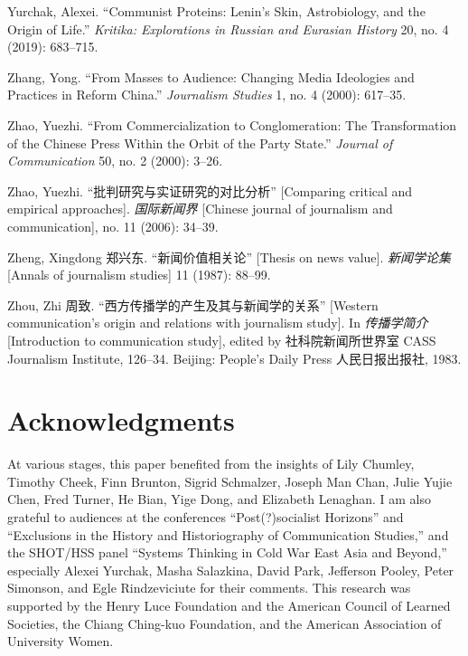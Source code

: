 \documentclass{tufte-handout}
\begin{document}
\begin{hangparas}{.25in}{1}
\begin{CJK*}{UTF8}{gbsn}
Yurchak, Alexei. ``Communist Proteins: Lenin's Skin, Astrobiology, and
the Origin of Life.'' \emph{Kritika: Explorations in Russian and
Eurasian History} 20, no. 4 (2019): 683--715.

Zhang, Yong. ``From Masses to Audience: Changing Media Ideologies and
Practices in Reform China.'' \emph{Journalism Studies} 1, no. 4 (2000):
617--35.

Zhao, Yuezhi. ``From Commercialization to Conglomeration: The
Transformation of the Chinese Press Within the Orbit of the Party
State.'' \emph{Journal of Communication} 50, no. 2 (2000): 3--26.

Zhao, Yuezhi. ``批判研究与实证研究的对比分析'' {[}Comparing critical and
empirical approaches{]}. \emph{国际新闻界} {[}Chinese journal of
journalism and communication{]}, no. 11 (2006): 34--39.

Zheng, Xingdong 郑兴东. ``新闻价值相关论'' {[}Thesis on news value{]}.
\emph{新闻学论集} {[}Annals of journalism studies{]} 11 (1987): 88--99.

\enlargethispage{\baselineskip}

Zhou, Zhi 周致. ``西方传播学的产生及其与新闻学的关系'' {[}Western
communication's origin and relations with journalism study{]}. In
\emph{传播学简介} {[}Introduction to communication study{]}, edited by
社科院新闻所世界室 CASS Journalism Institute, 126--34. Beijing: People's
Daily Press 人民日报出报社, 1983.

\end{CJK*}

\end{hangparas}
\vspace{2em}

\hypertarget{acknowledgments}{%
\section{Acknowledgments}\label{acknowledgments}}

At various stages, this paper benefited from the insights of Lily
Chumley, Timothy Cheek, Finn Brunton, Sigrid Schmalzer, Joseph Man Chan,
Julie Yujie Chen, Fred Turner, He Bian, Yige Dong, and Elizabeth
Lenaghan. I am also grateful to audiences at the conferences
``Post(?)socialist Horizons'' and ``Exclusions in the History and
Historiography of Communication Studies,'' and the SHOT/HSS panel
``Systems Thinking in Cold War East Asia and Beyond,'' especially Alexei
Yurchak, Masha Salazkina, David Park, Jefferson Pooley, Peter Simonson,
and Egle Rindzeviciute for their comments. This research was supported
by the Henry Luce Foundation and the American Council of Learned
Societies, the Chiang Ching-kuo Foundation, and the American Association
of University Women.
\end{document}
